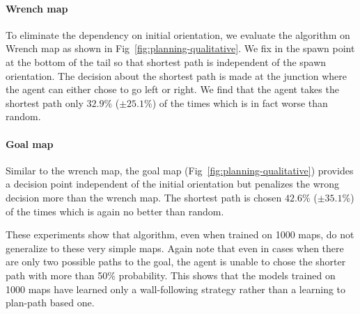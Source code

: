 \paragraph{Wrench map}
To eliminate the dependency on initial orientation, we evaluate the algorithm on Wrench map as shown in Fig~\ref{fig:planning-qualitative}. We fix in the spawn point at the bottom of the tail so that shortest path is independent of the spawn orientation.
The decision about the shortest path is made at the junction where the agent can either chose to go left or right.
We find that the agent takes the shortest path only $32.9$\% ($\pm 25.1$\%) of the times which is in fact worse than random.

\paragraph{Goal map}
Similar to the wrench map, the goal map (Fig~\ref{fig:planning-qualitative}) provides a decision point independent of the initial orientation but penalizes the wrong decision more than the wrench map. The shortest path is chosen $42.6$\% ($\pm 35.1$\%) of the times which is again no better than random.

These experiments show that \NavAiiiCDiDiiL{} algorithm, even when trained on 1000 maps, do not generalize to these very simple maps.
Again note that even in cases when there are only two possible paths to the goal, the agent is unable to chose the shorter path with more than 50\% probability.
This shows that the models trained on 1000 maps have learned only a wall-following strategy rather than a learning to plan-path based one.

